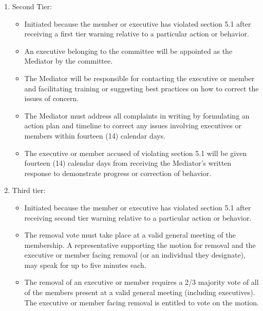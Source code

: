 \documentclass[12pt]{article}
\begin{document}
\begin{enumerate}[{5}.1]
\begin{enumerate}[{5.3}.1]
\begin{itemize}
        \end{itemize}
        \item	Second Tier: 
        \begin{itemize}
            \item	Initiated because the member or executive has violated section 5.1 after receiving a first tier warning relative to a particular action or behavior.
            \item An executive belonging to the committee will be appointed as the Mediator by the committee.
            \item	The Mediator will be responsible for contacting the executive or member and facilitating training or suggesting best practices on how to correct the issues of concern. 
            \item	The Mediator must address all complaints in writing by formulating an action plan and timeline to correct any issues involving executives or members within fourteen (14) calendar days. 
            \item	The executive or member accused of violating section 5.1 will be given fourteen (14) calendar days from receiving the Mediator's written response to demonstrate progress or correction of behavior. 
        \end{itemize}
        \item Third tier:
        \begin{itemize}
            \item	Initiated because the member or executive has violated section 5.1 after receiving second tier warning relative to a particular action or behavior.  
            \item	The removal vote must take place at a valid general meeting of the membership.  A representative supporting the motion for removal and the executive or member facing removal (or an individual they designate), may speak for up to five minutes each.
            \item	The removal of an executive or member requires a 2/3 majority vote of all of the members present at a valid general meeting (including executives).  The executive or member facing removal is entitled to vote on the motion. 
        \end{itemize}
    \end{enumerate}
\end{enumerate}


\end{document}
